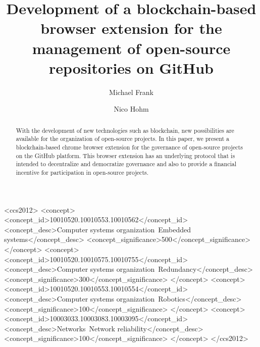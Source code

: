 \documentclass[sigconf]{acmart}
\begin{document}
\title{Development of a blockchain-based browser extension for the management of open-source repositories on GitHub}

\author{Michael Frank}

\author{Nico Hohm}

\begin{abstract}
With the development of new technologies such as blockchain, new possibilities are available for the organization of open-source projects. In this paper, we present a blockchain-based chrome browser extension for the governance of open-source projects on the GitHub platform. This browser extension has an underlying protocol that is intended to decentralize and democratize governance and also to provide a financial incentive for participation in open-source projects.
\end{abstract}

\begin{CCSXML}
<ccs2012>
 <concept>
  <concept_id>10010520.10010553.10010562</concept_id>
  <concept_desc>Computer systems organization~Embedded systems</concept_desc>
  <concept_significance>500</concept_significance>
 </concept>
 <concept>
  <concept_id>10010520.10010575.10010755</concept_id>
  <concept_desc>Computer systems organization~Redundancy</concept_desc>
  <concept_significance>300</concept_significance>
 </concept>
 <concept>
  <concept_id>10010520.10010553.10010554</concept_id>
  <concept_desc>Computer systems organization~Robotics</concept_desc>
  <concept_significance>100</concept_significance>
 </concept>
 <concept>
  <concept_id>10003033.10003083.10003095</concept_id>
  <concept_desc>Networks~Network reliability</concept_desc>
  <concept_significance>100</concept_significance>
 </concept>
</ccs2012>
\end{CCSXML}

\end{document}
